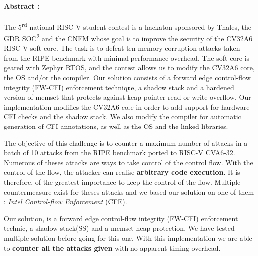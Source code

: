 \documentclass[9pt]{article}
\begin{document}


\clearpage 



\paragraph{Abstract :}

The 5\textsuperscript{rd} national RISC-V student contest is a hackaton sponsored by Thales, the GDR SOC\textsuperscript{2} and the CNFM whose goal is to improve the security of the CV32A6 RISC-V soft-core. The task is to defeat ten memory-corruption attacks taken from the RIPE benchmark with minimal performance overhead. The soft-core is geared with Zephyr RTOS, and the contest allows us to modify the CV32A6 core, the OS and/or the compiler. Our solution consists of a forward edge control-flow integrity (FW-CFI) enforcement technique, a shadow stack and a hardened version of memset that protects against heap pointer read or write overflow. Our implementation modifies the CV32A6 core in order to add support for hardware CFI checks and the shadow stack. We also modify the compiler for automatic generation of CFI annotations, as well as the OS and the linked libraries.

The objective of this challenge is to counter a maximum number of attacks in a batch of 10 attacks from the RIPE benchmark ported to RISC-V CVA6-32. 
Numerous of theses attacks are ways to take control of the control flow. 
With the control of the flow, the attacker can realise \textbf{arbitrary code execution}. It is therefore, of the greatest importance to keep the control of the flow.
Multiple countermeasure exist for theses attacks and we based our solution on one of them : \textit{Intel Control-flow Enforcement}\cite{intel_cet} (CFE).

Our solution, is a forward edge control-flow integrity (FW-CFI) enforcement technic, a shadow stack(SS) and a memset heap protection. We have tested multiple solution before going for this one. With this implementation we are able to \textbf{counter all the attacks given} with no apparent timing overhead.

\vspace{1cm}
\end{document}
